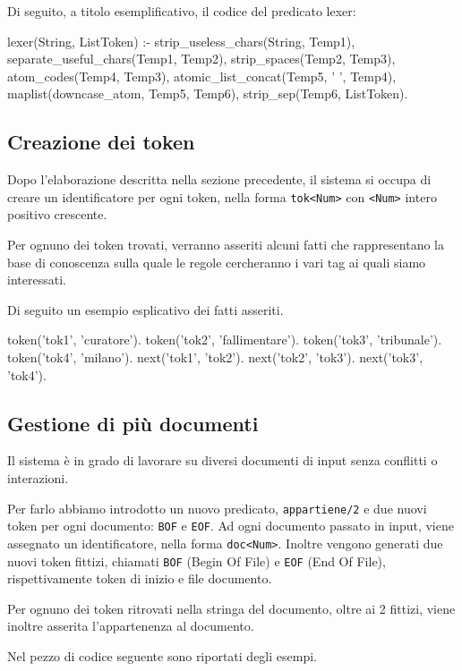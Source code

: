Di seguito, a titolo esemplificativo, il codice del predicato lexer:

\begin{prologcode}
lexer(String, ListToken) :-
   strip_useless_chars(String, Temp1),
   separate_useful_chars(Temp1, Temp2),
   strip_spaces(Temp2, Temp3),
   atom_codes(Temp4, Temp3),
   atomic_list_concat(Temp5, ' ', Temp4),
   maplist(downcase_atom, Temp5, Temp6),
   strip_sep(Temp6, ListToken).
\end{prologcode}

\subsection{Creazione dei token}
\label{sec:creazionetoken}
Dopo l'elaborazione descritta nella sezione precedente, il sistema si occupa di creare un identificatore per ogni token, nella forma \verb:tok<Num>: con \verb+<Num>+ intero positivo crescente.

Per ognuno dei token trovati, verranno asseriti alcuni fatti che rappresentano la base di conoscenza sulla quale le regole cercheranno i vari tag ai quali siamo interessati.

Di seguito un esempio esplicativo dei fatti asseriti.

\begin{prologcode}
token('tok1', 'curatore').
token('tok2', 'fallimentare').
token('tok3', 'tribunale').
token('tok4', 'milano').
next('tok1', 'tok2').
next('tok2', 'tok3').
next('tok3', 'tok4').
\end{prologcode}


\subsection{Gestione di più documenti}
Il sistema è in grado di lavorare su diversi documenti di input senza conflitti o interazioni.

Per farlo abbiamo introdotto un nuovo predicato, \verb+appartiene/2+ e due nuovi token per ogni documento: \verb+BOF+ e \verb+EOF+.
Ad ogni documento passato in input, viene assegnato un identificatore, nella forma \verb:doc<Num>:. Inoltre vengono generati due nuovi token fittizi, chiamati \verb+BOF+ (Begin Of File) e \verb+EOF+ (End Of File), rispettivamente token di inizio e file documento.

Per ognuno dei token ritrovati nella stringa del documento, oltre ai 2 fittizi, viene inoltre asserita l'appartenenza al documento.

Nel pezzo di codice seguente sono riportati degli esempi.

